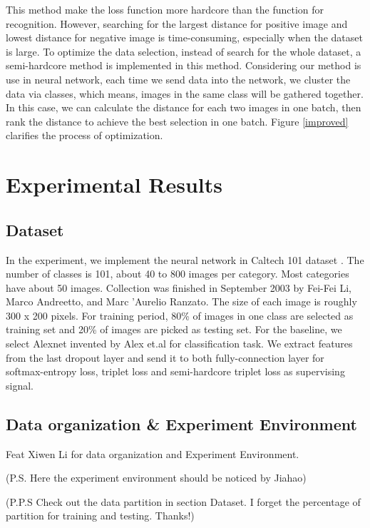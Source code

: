 \documentclass[10pt,twocolumn,letterpaper]{article}
\begin{document}
This method make the loss function more hardcore than the function for recognition. However, searching for the largest distance for positive image and lowest distance for negative image is time-consuming, especially when the dataset is large. To optimize the data selection, instead of search for the whole dataset, a semi-hardcore method is implemented in this method. Considering our method is use in neural network, each time we send data into the network, we cluster the data via classes, which means, images in the same class will be gathered together. In this case, we can calculate the distance for each two images in one batch, then rank the distance to achieve the best selection in one batch. Figure \ref{improved} clarifies the process of optimization.
\section{Experimental Results}

\subsection{Dataset}
In the experiment, we implement the neural network in Caltech 101 dataset \cite{griffin2007caltech}. The number of classes is 101, about 40 to 800 images per category. Most categories have about 50 images. Collection was finished in September 2003 by Fei-Fei Li, Marco Andreetto, and Marc 'Aurelio Ranzato. The size of each image is roughly 300 x 200 pixels. For training period, 80\% of images in one class are selected as training set and 20\% of images are picked as testing set. For the baseline, we select Alexnet invented by Alex et.al \cite{NIPS2012_4824} for classification task. We extract features from the last dropout layer and send it to both fully-connection layer for softmax-entropy loss, triplet loss and semi-hardcore triplet loss as supervising signal.

\subsection{Data organization \& Experiment Environment}

Feat Xiwen Li for data organization and Experiment Environment.

(P.S. Here the experiment environment should be noticed by Jiahao)

(P.P.S Check out the data partition in section Dataset. I forget the percentage of partition for training and testing. Thanks!)
\end{document}
